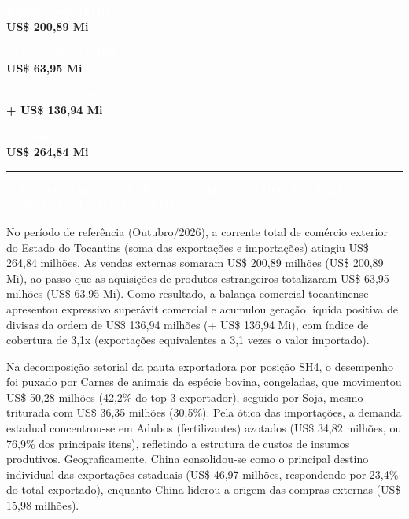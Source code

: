 \documentclass[10pt,a4paper]{article}
\newcommand{\secaojornal}[1]{%
  \vspace{6pt}%
  {\noindent\colorbox{azulto}{%
    \parbox{\dimexpr\textwidth-2\fboxsep\relax}{%
      \vspace{3pt}\hspace{4pt}\textcolor{douradoto}{\rule{7pt}{7pt}}\hspace{6pt}%
      \textcolor{white}{\textbf{\normalsize \MakeUppercase{#1}}}\vspace{3pt}%
    }%
  }}%
  \vspace{4pt}%
}
\begin{document}
\vspace{4pt}

\noindent\colorbox{azulto}{\parbox[t][1.32cm][c]{0.225\textwidth}{\centering\scriptsize\textcolor{white}{\textbf{Exportações (FOB)}}\\[3pt]{\large\textbf{\textcolor{douradoto}{US\$ 200,89 Mi}}}}}\hfill\colorbox{azulto}{\parbox[t][1.32cm][c]{0.225\textwidth}{\centering\scriptsize\textcolor{white}{\textbf{Importações (FOB)}}\\[3pt]{\large\textbf{\textcolor{douradoto}{US\$ 63,95 Mi}}}}}\hfill\colorbox{azulto}{\parbox[t][1.32cm][c]{0.225\textwidth}{\centering\scriptsize\textcolor{white}{\textbf{Saldo Comercial}}\\[3pt]{\large\textbf{\textcolor{douradoto}{+ US\$ 136,94 Mi}}}}}\hfill\colorbox{azulto}{\parbox[t][1.32cm][c]{0.225\textwidth}{\centering\scriptsize\textcolor{white}{\textbf{Corrente Total}}\\[3pt]{\large\textbf{\textcolor{douradoto}{US\$ 264,84 Mi}}}}}
\vspace{5pt}


\secaojornal{1. Panorama Estatístico e Resultados do Período (Síntese Automatizada)}

No período de referência (Outubro/2026), a corrente total de comércio exterior do Estado do Tocantins (soma das exportações e importações) atingiu US\$ 264,84 milhões. As vendas externas somaram US\$ 200,89 milhões (US\$ 200,89 Mi), ao passo que as aquisições de produtos estrangeiros totalizaram US\$ 63,95 milhões (US\$ 63,95 Mi). Como resultado, a balança comercial tocantinense apresentou expressivo superávit comercial e acumulou geração líquida positiva de divisas da ordem de US\$ 136,94 milhões (+ US\$ 136,94 Mi), com índice de cobertura de 3,1x (exportações equivalentes a 3,1 vezes o valor importado).

\vspace{4pt}

Na decomposição setorial da pauta exportadora por posição SH4, o desempenho foi puxado por Carnes de animais da espécie bovina, congeladas, que movimentou US\$ 50,28 milhões (42,2\% do top 3 exportador), seguido por Soja, mesmo triturada com US\$ 36,35 milhões (30,5\%). Pela ótica das importações, a demanda estadual concentrou-se em Adubos (fertilizantes) azotados (US\$ 34,82 milhões, ou 76,9\% dos principais itens), refletindo a estrutura de custos de insumos produtivos. Geograficamente, China consolidou-se como o principal destino individual das exportações estaduais (US\$ 46,97 milhões, respondendo por 23,4\% do total exportado), enquanto China liderou a origem das compras externas (US\$ 15,98 milhões).
\end{document}
